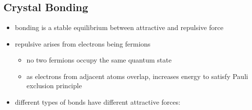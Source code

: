 \documentclass[a4paper,11pt,normalem]{article}
\begin{document}
\section{}
\subsection{Crystal Bonding}

\begin{itemize}
    \item bonding is a stable equilibrium between attractive and repulsive force
    \item repulsive arises from electrons being fermions
        \begin{itemize}
            \item no two fermions occupy the same quantum state
            \item as electrons from adjacent atoms overlap, increases energy to satisfy Pauli exclusion principle
        \end{itemize}
    \item different types of bonds have different attractive forces:
\end{itemize}
\end{document}
